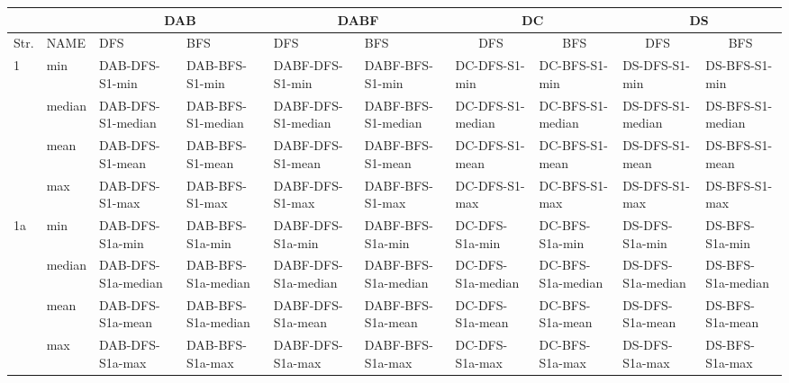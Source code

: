 \begin{table}
\centering
\begin{tabular}{|l|l|l|l|l|l|l|l|l|l|}
\hline
\multicolumn{2}{|l|}{}       & \multicolumn{2}{c|}{DAB}                & \multicolumn{2}{c|}{DABF}                 & \multicolumn{2}{c|}{DC}                             & \multicolumn{2}{c|}{DS}                              \\
\hline
Str.                &  NAME      & DFS                & BFS                & DFS                 & BFS                 & \multicolumn{1}{c|}{DFS} & \multicolumn{1}{c|}{BFS} & \multicolumn{1}{c|}{DFS} & \multicolumn{1}{c|}{BFS}  \\
\hline
\multirow{4}{*}{1}  & min    & DAB-DFS-S1-min     & DAB-BFS-S1-min     & DABF-DFS-S1-min     & DABF-BFS-S1-min     & DC-DFS-S1-min            & DC-BFS-S1-min            & DS-DFS-S1-min            & DS-BFS-S1-min             \\
                    & median & DAB-DFS-S1-median  & DAB-BFS-S1-median  & DABF-DFS-S1-median  & DABF-BFS-S1-median  & DC-DFS-S1-median         & DC-BFS-S1-median         & DS-DFS-S1-median         & DS-BFS-S1-median          \\
                    & mean   & DAB-DFS-S1-mean    & DAB-BFS-S1-mean    & DABF-DFS-S1-mean    & DABF-BFS-S1-mean    & DC-DFS-S1-mean           & DC-BFS-S1-mean           & DS-DFS-S1-mean           & DS-BFS-S1-mean            \\
                    & max    & DAB-DFS-S1-max     & DAB-BFS-S1-max     & DABF-DFS-S1-max     & DABF-BFS-S1-max     & DC-DFS-S1-max            & DC-BFS-S1-max            & DS-DFS-S1-max            & DS-BFS-S1-max             \\
\hline
\multirow{4}{*}{1a} & min    & DAB-DFS-S1a-min    & DAB-BFS-S1a-min    & DABF-DFS-S1a-min    & DABF-BFS-S1a-min    & DC-DFS-S1a-min           & DC-BFS-S1a-min           & DS-DFS-S1a-min           & DS-BFS-S1a-min            \\
                    & median & DAB-DFS-S1a-median & DAB-BFS-S1a-median & DABF-DFS-S1a-median & DABF-BFS-S1a-median & DC-DFS-S1a-median        & DC-BFS-S1a-median        & DS-DFS-S1a-median        & DS-BFS-S1a-median         \\
                    & mean   & DAB-DFS-S1a-mean   & DAB-BFS-S1a-median & DABF-DFS-S1a-mean   & DABF-BFS-S1a-mean   & DC-DFS-S1a-mean          & DC-BFS-S1a-mean          & DS-DFS-S1a-mean          & DS-BFS-S1a-mean           \\
                    & max    & DAB-DFS-S1a-max    & DAB-BFS-S1a-max    & DABF-DFS-S1a-max    & DABF-BFS-S1a-max    & DC-DFS-S1a-max           & DC-BFS-S1a-max           & DS-DFS-S1a-max           & DS-BFS-S1a-max            \\

\end{tabular}
\end{table}
